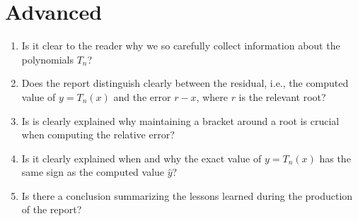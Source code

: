 \documentclass[a4paper,12pt]{article}
\begin{document}
\section{Advanced}

\begin{enumerate}
\item Is it clear to the reader why we so carefully collect information about the polynomials $T_n$?
\item Does the report distinguish clearly between the residual, i.e., the computed value of $y = T_n(x)$ and the error $r-x$, where $r$ is the relevant root?
\item Is is clearly explained why maintaining a bracket around a root is crucial when computing the relative error?
\item Is it clearly explained when and why the exact value of $y=T_n(x)$ has the same sign as the computed value $\hat{y}$?
\item Is there a conclusion summarizing the lessons learned during the production of the report?
\end{enumerate}
\end{document}
